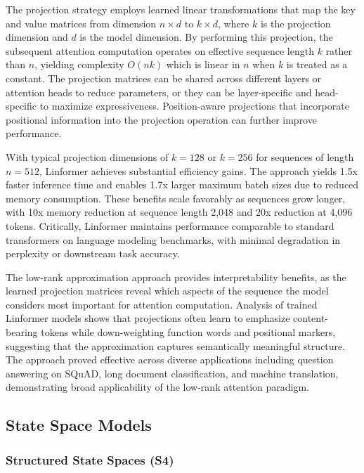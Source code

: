 The projection strategy employs learned linear transformations that map the key and value matrices from dimension $n \times d$ to $k \times d$, where $k$ is the projection dimension and $d$ is the model dimension. By performing this projection, the subsequent attention computation operates on effective sequence length $k$ rather than $n$, yielding complexity $O(nk)$ which is linear in $n$ when $k$ is treated as a constant. The projection matrices can be shared across different layers or attention heads to reduce parameters, or they can be layer-specific and head-specific to maximize expressiveness. Position-aware projections that incorporate positional information into the projection operation can further improve performance.

With typical projection dimensions of $k=128$ or $k=256$ for sequences of length $n=512$, Linformer achieves substantial efficiency gains. The approach yields 1.5x faster inference time and enables 1.7x larger maximum batch sizes due to reduced memory consumption. These benefits scale favorably as sequences grow longer, with 10x memory reduction at sequence length 2,048 and 20x reduction at 4,096 tokens. Critically, Linformer maintains performance comparable to standard transformers on language modeling benchmarks, with minimal degradation in perplexity or downstream task accuracy.

The low-rank approximation approach provides interpretability benefits, as the learned projection matrices reveal which aspects of the sequence the model considers most important for attention computation. Analysis of trained Linformer models shows that projections often learn to emphasize content-bearing tokens while down-weighting function words and positional markers, suggesting that the approximation captures semantically meaningful structure. The approach proved effective across diverse applications including question answering on SQuAD, long document classification, and machine translation, demonstrating broad applicability of the low-rank attention paradigm.

\subsection{State Space Models}

\subsubsection{Structured State Spaces (S4)}

